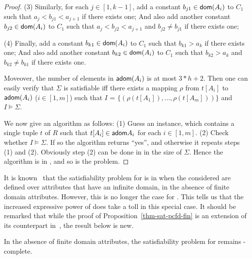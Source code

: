 \begin{proof}
\item[(3)] Similarly, for each $j\in[1, k - 1]$, add a constant $b_{j1}\in\protect\mathsf{dom}(A_i)$ to $C_1$
such that $a_j < b_{j1} < a_{j+1}$ if there exists
one; And also add another constant $b_{j2}\in\protect\mathsf{dom}(A_i)$ to $C_1$ such
that $a_j < b_{j2} < a_{j+1}$ and $b_{j2}\ne b_{j1}$ if
there exists one;

\item[(4)] Finally, add a constant $b_{k1}\in\protect\mathsf{dom}(A_i)$ to $C_1$ such that $b_{k1} > a_k$ if there exists one;
And also add another constant $b_{k2}\in\protect\mathsf{dom}(A_i)$ to $C_1$ such that
$b_{k2} > a_k$ and $b_{k2} \ne b_{k1}$ if there exists one. 
\ei

\noindent Moveover, the number of elements in ${\mathsf{adom}}(A_i)$ is at
most $3*h + 2$. Then one can easily verify that $\Sigma$ is
satisfiable iff there exists a mapping $\rho$ from $t[A_i]$ to
${\mathsf{adom}}(A_i)$ ($i\in [1, m]$) such that $I$ = $\{(\rho(t[A_1]),
\ldots, \rho(t[A_m]))\}$ and $I \models \Sigma$.


We now give an \NP algorithm as follows: (1) Guess an
instance, which contains a single tuple $t$ of $R$ such that
$t[A_i]\in{\ensuremath {\mathsf{adom}}}{A_i}$ for each $i \in [1, m]$. (2) Check whether $I
\models \Sigma$. If so the algorithm returns ``yes'', and otherwise
it repeats steps (1) and (2). Obviously step (2) can be done in
\PTIME in the size of $\Sigma$. Hence the algorithm is in \NP, and
so is the problem. 
\end{proof}


It is known~\cite{CFDs} that the satisfiability problem for \CFDs is
in \PTIME when the \CFDs considered are defined over attributes that
have an infinite domain, \ie in the absence of finite domain
attributes. However, this is no longer the case for \pCFDs. This
tells us that the increased expressive power of \pCFDs does take a
toll in this special case. It should be remarked that while the
proof of Proposition~\ref{thm-sat-pcfd-fin} is an extension of its
counterpart in~\cite{CFDs}, the result below is new.


\begin{theorem}
\label{thm-sat-pcfd-infin} In the absence of finite domain
attributes, the satisfiability problem for \pCFDs remains
\NP-complete.
\end{theorem}

